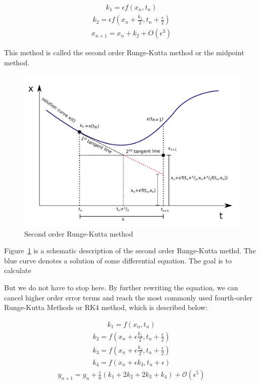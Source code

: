 \documentclass[10pt,letterpaper]{article}
\begin{document}
\begin{eqnarray}k_1=\epsilon f(x_n,t_n)\end{eqnarray}
\begin{eqnarray}k_2=\epsilon f(x_n+\frac{k_1}{2},t_n+\frac{\epsilon}{2})\end{eqnarray}
\begin{eqnarray}x_{n+1}=x_n+k_2+O(\epsilon^3)\end{eqnarray}


This method is called the second order Runge-Kutta method or the midpoint method.
\begin{figure}
\includegraphics[scale=0.4]{Figures/fig4.pdf} 
\caption{Second order Runge-Kutta method}
\label{fig:RK2}
\end{figure}
Figure~\ref{fig:RK2} is a schematic description of the second order Runge-Kutta methd. The blue curve denotes a solution of some differential equation. The goal is to calculate 

But we do not have to stop here. By further rewriting the equation, we can cancel higher order error terms and reach the most commonly used fourth-order Runge-Kutta Methods or RK4 method, which is described below:

\begin{eqnarray}k_1=f(x_n,t_n)\end{eqnarray}
\begin{eqnarray}k_2=f(x_n+\epsilon\frac{k_1}{2},t_n+\frac{\epsilon}{2})\end{eqnarray}
\begin{eqnarray}k_3=f(x_n+\epsilon\frac{k_2}{2},t_n+\frac{\epsilon}{2})\end{eqnarray}
\begin{eqnarray}k_4=f(x_n+\epsilon k_3,t_n+\epsilon)\end{eqnarray}
\begin{eqnarray}y_{n+1}=y_n+\frac{\epsilon}{6}(k_1+2 k_2+2 k_3+k_4)+\mathcal{O}(\epsilon^5)\end{eqnarray}
\end{document}
